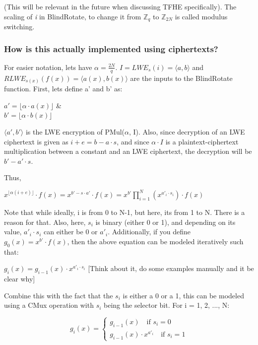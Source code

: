 \documentclass{report}
\begin{document}
(This will be relevant in the future when discussing TFHE specifically). The scaling of \textit{i} in BlindRotate, to change it from $\mathbb{Z}_q$ to $\mathbb{Z}_{2N}$ is called modulus switching.

\subsubsection{How is this actually implemented using ciphertexts?}
For easier notation, lets have $\alpha = \frac{2N}{q}$. $I = LWE_s(i) = \langle a, b \rangle$ and $RLWE_{s(x)} (f(x)) = \langle a(x), b(x) \rangle$ are the inputs to the BlindRotate function. First, lets define a' and b' as:\\
\begin{center}
	$a' = \lfloor \alpha \cdot a(x) \rfloor$ \&\\
	$b' = \lfloor \alpha \cdot b(x) \rfloor$
\end{center}
$\langle a', b' \rangle$ is the LWE encryption of PMul($\alpha$, I). Also, since decryption of an LWE ciphertext is given as $ i + e = b - a \cdot s$, and since $\alpha \cdot I$ is a plaintext-ciphertext multiplication between a constant and an LWE ciphertext, the decryption will be $b' - a' \cdot s$. \newline

Thus,
\begin{center}
	$x^{\lfloor \alpha(i + e) \rfloor} \cdot f(x) = x^{b' - s \cdot a'} \cdot f(x) = x^{b'} \prod\limits_{i=1}^{N} (x^{a'_i \cdot s_i}) \cdot f(x)$
\end{center}
Note that while ideally, i is from 0 to N-1, but here, its from 1 to N. There is a reason for that. \newline
Also, here, $s_i$ is binary (either 0 or 1), and depending on its value, $a'_i \cdot s_i$ can either be 0 or $a'_i$. Additionally, if you define $g_0(x) = x^{b'} \cdot f(x)$, then the above equation can be modeled iteratively such that: 
\begin{center}
	$g_i (x) = g_{i-1}(x) \cdot x^{a'_i \cdot s_i}$ [Think about it, do some examples manually and it be clear why]
\end{center}

Combine this with the fact that the $s_i$ is either a 0 or a 1, this can be modeled using a CMux operation with $s_i$ being the selector bit. For i = 1, 2, ..., N:
\begin{center}
	\begin{equation}
		g_i (x) = 
		\begin{cases}
			g_{i-1} (x) \quad \text{if } s_i = 0 \\
			g_{i-1} (x) \cdot x^{a'_i} \quad \text{if } s_i = 1
		\end{cases}
	\end{equation}
\end{center}
\end{document}

